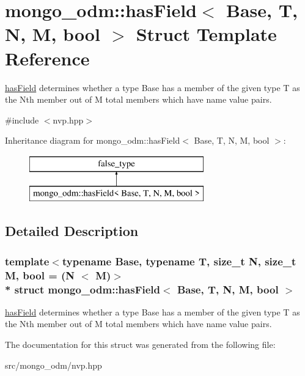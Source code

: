 \hypertarget{structmongo__odm_1_1hasField}{}\section{mongo\+\_\+odm\+:\+:has\+Field$<$ Base, T, N, M, bool $>$ Struct Template Reference}
\label{structmongo__odm_1_1hasField}


\hyperlink{structmongo__odm_1_1hasField}{has\+Field} determines whether a type Base has a member of the given type T as the Nth member out of M total members which have name value pairs.  




{\ttfamily \#include $<$nvp.\+hpp$>$}

Inheritance diagram for mongo\+\_\+odm\+:\+:has\+Field$<$ Base, T, N, M, bool $>$\+:\begin{figure}[H]
\begin{center}
\leavevmode
\includegraphics[height=2.000000cm]{structmongo__odm_1_1hasField}
\end{center}
\end{figure}


\subsection{Detailed Description}
\subsubsection*{template$<$typename Base, typename T, size\+\_\+t N, size\+\_\+t M, bool = (\+N $<$ M)$>$\\*
struct mongo\+\_\+odm\+::has\+Field$<$ Base, T, N, M, bool $>$}

\hyperlink{structmongo__odm_1_1hasField}{has\+Field} determines whether a type Base has a member of the given type T as the Nth member out of M total members which have name value pairs. 

The documentation for this struct was generated from the following file\+:\begin{DoxyCompactItemize}
\item 
src/mongo\+\_\+odm/nvp.\+hpp\end{DoxyCompactItemize}
